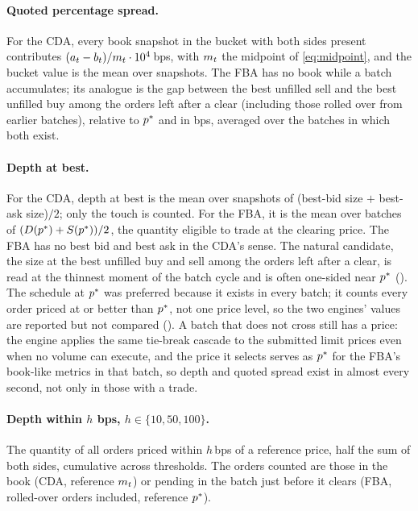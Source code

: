 \paragraph{Quoted percentage spread.} For the CDA, every book snapshot in
the bucket with both sides present contributes $(a_t - b_t)/m_{t} \cdot
10^{4}$\,bps, with $m_{t}$ the midpoint of \eqref{eq:midpoint}, and the
bucket value is the mean over snapshots. The FBA
has no book while a batch accumulates; its analogue is the gap between the
best unfilled sell and the best unfilled buy among the orders left after
a clear (including those rolled over from earlier batches), relative to
$p^{\ast}$ and in bps, averaged over the batches in which both exist.

\paragraph{Depth at best.} For the CDA, depth at best is the mean over
snapshots of (best-bid size $+$ best-ask size)$/2$; only the touch is
counted. For the FBA, it is the mean over batches of
$(D(p^{\ast}) + S(p^{\ast}))/2$, the quantity eligible to trade at the clearing
price. The FBA has no best bid and best ask in the CDA's sense. The
natural candidate, the size at the best unfilled buy and sell among the
orders left after a clear, is read at the thinnest moment of the batch
cycle and is often one-sided near $p^{\ast}$ (). The
schedule at $p^{\ast}$ was preferred because it exists in every batch; it
counts every order priced at or better than $p^{\ast}$, not one price level,
so the two engines' values are reported but not compared
(). A batch that does not cross still has a
price: the engine applies the same tie-break cascade to the submitted
limit prices even when no volume can execute, and the price it selects
serves as $p^{\ast}$ for the FBA's book-like metrics in that batch, so depth
and quoted spread exist in almost every second, not only in those with a
trade.

\paragraph{Depth within $h$ bps, $h \in \{10, 50, 100\}$.} The
quantity of all orders priced within $h$\,bps of a reference price, half
the sum of both sides, cumulative across thresholds. The orders counted
are those in the book (CDA, reference $m_{t}$) or pending in the batch
just before it clears (FBA, rolled-over orders included, reference
$p^{\ast}$).

